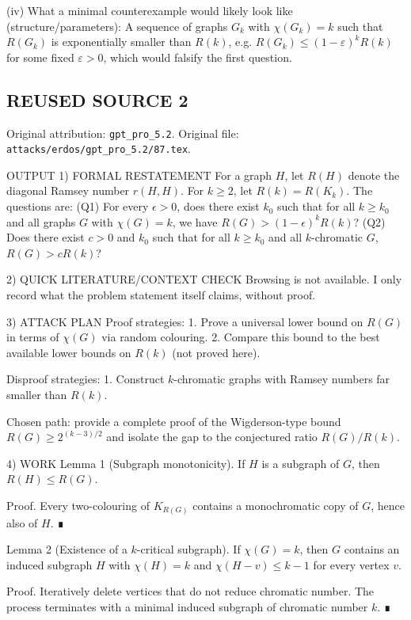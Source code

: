 (iv) What a minimal counterexample would likely look like (structure/parameters):
A sequence of graphs $G_k$ with $\chi(G_k)=k$ such that $R(G_k)$ is exponentially smaller than $R(k)$, e.g.
$R(G_k)\le (1-\varepsilon)^k R(k)$ for some fixed $\varepsilon>0$, which would falsify the first question.



\subsection*{REUSED SOURCE 2}
Original attribution: \texttt{gpt\_pro\_5.2}.
Original file: \texttt{attacks/erdos/gpt\_pro\_5.2/87.tex}.


OUTPUT
1) FORMAL RESTATEMENT
For a graph $H$, let $R(H)$ denote the diagonal Ramsey number $r(H,H)$. For $k\ge 2$, let
$R(k)=R(K_k)$. The questions are:
(Q1) For every $\epsilon>0$, does there exist $k_0$ such that for all $k\ge k_0$ and all graphs $G$
with $\chi(G)=k$, we have $R(G)>(1-\epsilon)^k R(k)$?
(Q2) Does there exist $c>0$ and $k_0$ such that for all $k\ge k_0$ and all $k$-chromatic $G$,
$R(G)>cR(k)$?

2) QUICK LITERATURE/CONTEXT CHECK
Browsing is not available. I only record what the problem statement itself claims, without proof.

3) ATTACK PLAN
Proof strategies:
1. Prove a universal lower bound on $R(G)$ in terms of $\chi(G)$ via random colouring.
2. Compare this bound to the best available lower bounds on $R(k)$ (not proved here).

Disproof strategies:
1. Construct $k$-chromatic graphs with Ramsey numbers far smaller than $R(k)$.

Chosen path: provide a complete proof of the Wigderson-type bound $R(G)\ge 2^{(k-3)/2}$ and
isolate the gap to the conjectured ratio $R(G)/R(k)$.

4) WORK
Lemma 1 (Subgraph monotonicity).
If $H$ is a subgraph of $G$, then $R(H)\le R(G)$.

Proof.
Every two-colouring of $K_{R(G)}$ contains a monochromatic copy of $G$, hence also of $H$. ∎

Lemma 2 (Existence of a $k$-critical subgraph).
If $\chi(G)=k$, then $G$ contains an induced subgraph $H$ with $\chi(H)=k$ and
$\chi(H-v)\le k-1$ for every vertex $v$.

Proof.
Iteratively delete vertices that do not reduce chromatic number. The process terminates with a
minimal induced subgraph of chromatic number $k$. ∎

